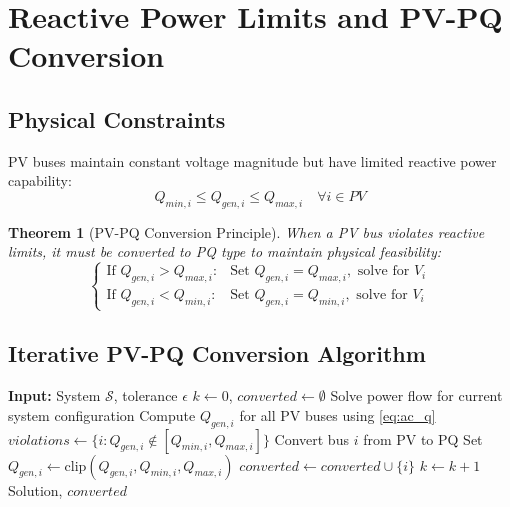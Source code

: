 \documentclass[11pt]{article}
\newtheorem{theorem}{Theorem}
\begin{document}
\section{Reactive Power Limits and PV-PQ Conversion}

\subsection{Physical Constraints}

PV buses maintain constant voltage magnitude but have limited reactive power capability:
\begin{equation}
Q_{min,i} \leq Q_{gen,i} \leq Q_{max,i} \quad \forall i \in PV
\end{equation}

\begin{theorem}[PV-PQ Conversion Principle]
When a PV bus violates reactive limits, it must be converted to PQ type to maintain physical feasibility:
\begin{equation}
\begin{cases}
\text{If } Q_{gen,i} > Q_{max,i}: & \text{Set } Q_{gen,i} = Q_{max,i}, \text{ solve for } V_i \\
\text{If } Q_{gen,i} < Q_{min,i}: & \text{Set } Q_{gen,i} = Q_{min,i}, \text{ solve for } V_i
\end{cases}
\end{equation}
\end{theorem}

\subsection{Iterative PV-PQ Conversion Algorithm}

\begin{algorithm}
\caption{Adaptive PV-PQ Conversion}
\begin{algorithmic}[1]
\STATE \textbf{Input:} System $\mathcal{S}$, tolerance $\epsilon$
\STATE $k \leftarrow 0$, $converted \leftarrow \emptyset$
\REPEAT
    \STATE Solve power flow for current system configuration
    \STATE Compute $Q_{gen,i}$ for all PV buses using \eqref{eq:ac_q}
    \STATE $violations \leftarrow \{i : Q_{gen,i} \notin [Q_{min,i}, Q_{max,i}]\}$
            \STATE Convert bus $i$ from PV to PQ
            \STATE Set $Q_{gen,i} \leftarrow \text{clip}(Q_{gen,i}, Q_{min,i}, Q_{max,i})$
            \STATE $converted \leftarrow converted \cup \{i\}$
        \ENDFOR
        \STATE $k \leftarrow k + 1$
    \ENDIF
{}
\RETURN Solution, $converted$
\end{algorithmic}
\end{algorithm}
\end{document}
